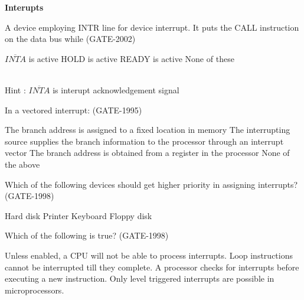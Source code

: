 
\centerline{\textbf{ \LARGE Interupts }}

\begin{questyle}
  \question  A device employing INTR line for device interrupt. It puts the CALL instruction
             on the data bus while  (GATE-2002)

  \begin{oneparchoices}
    \CorrectChoice  \( \overline{INTA} \) is active
    \choice         HOLD is active
    \choice         READY is active
    \choice         None of these
  \end{oneparchoices}
  \\ Hint : \( \overline{INTA} \)  is interupt acknowledgement signal
\end{questyle}


\begin{questyle}
  \question  In a vectored interrupt:  (GATE-1995)
  \begin{choices}
    \choice         The branch address is assigned to a fixed location in memory
    \CorrectChoice  The interrupting source supplies the branch information to the processor through an interrupt vector
    \choice         The branch address is obtained from a register in the processor
    \choice         None of the above
  \end{choices}
\end{questyle}

\begin{questyle}
  \question  Which of the following devices should get higher priority in assigning interrupts?  (GATE-1998)

  \begin{oneparchoices}
    \choice         Hard disk
    \choice         Printer
    \choice         Keyboard
    \choice         Floppy disk
  \end{oneparchoices}
\end{questyle}


\begin{questyle}
  \question  Which of the following is true?  (GATE-1998)

  \begin{choices}
    \CorrectChoice  Unless enabled, a CPU will not be able to process interrupts.
    \choice         Loop instructions cannot be interrupted till they complete.
    \choice         A processor checks for interrupts before executing a new instruction.
    \choice         Only level triggered interrupts are possible in microprocessors.
  \end{choices}
\end{questyle}

